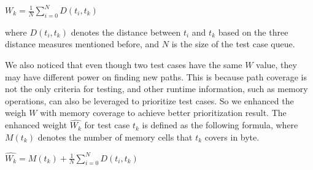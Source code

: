 \begin{center}
$W_k = \displaystyle\frac{1}{N} \sum_{i=0}^{N} D(t_i, t_k)$
\end{center}
where $D(t_i, t_k)$ denotes the distance between $t_i$ and $t_k$ based on the three distance measures mentioned before, and $N$ is the size of the test case queue. 

We also noticed that even though two test cases have the same $W$ value, they may have different power on finding new paths.
 This is because path coverage is not the only criteria for testing, and other runtime information, such as memory operations, can also be leveraged to prioritize test cases. 
 So we enhanced the weigh $W$ with memory coverage to achieve better prioritization result. The enhanced weight $\hat{W_k}$ for test case $t_k$ is defined as the following formula, where $M(t_k)$ denotes the number of memory cells that $t_k$ covers in byte.
\begin{center}
$\hat{W_k} = \displaystyle M(t_k) + \frac{1}{N} \sum_{i=0}^{N} D(t_i, t_k)$
\end{center} 